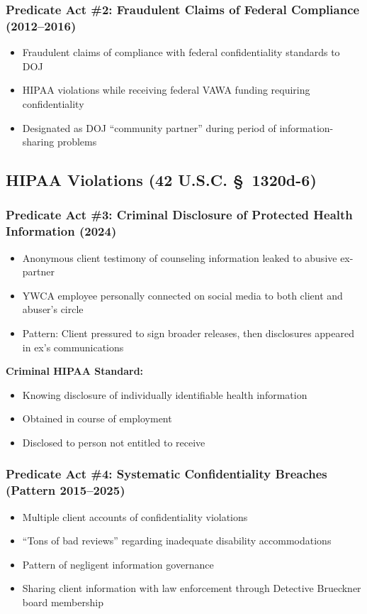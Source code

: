 \documentclass[11pt,letterpaper]{article}
\begin{document}
\subsubsection{Predicate Act \#2: Fraudulent Claims of Federal Compliance (2012--2016)}
\begin{itemize}[leftmargin=*]
\item Fraudulent claims of compliance with federal confidentiality standards to DOJ
\item HIPAA violations while receiving federal VAWA funding requiring confidentiality
\item Designated as DOJ ``community partner'' during period of information-sharing problems
\end{itemize}

\subsection{HIPAA Violations (42 U.S.C. \S~1320d-6)}

\subsubsection{Predicate Act \#3: Criminal Disclosure of Protected Health Information (2024)}
\begin{itemize}[leftmargin=*]
\item Anonymous client testimony of counseling information leaked to abusive ex-partner
\item YWCA employee personally connected on social media to both client and abuser's circle
\item Pattern: Client pressured to sign broader releases, then disclosures appeared in ex's communications
\end{itemize}

\textbf{Criminal HIPAA Standard:}
\begin{itemize}[leftmargin=*]
\item Knowing disclosure of individually identifiable health information
\item Obtained in course of employment
\item Disclosed to person not entitled to receive
\end{itemize}

\subsubsection{Predicate Act \#4: Systematic Confidentiality Breaches (Pattern 2015--2025)}
\begin{itemize}[leftmargin=*]
\item Multiple client accounts of confidentiality violations
\item ``Tons of bad reviews'' regarding inadequate disability accommodations
\item Pattern of negligent information governance
\item Sharing client information with law enforcement through Detective Brueckner board membership
\end{itemize}
\end{document}
